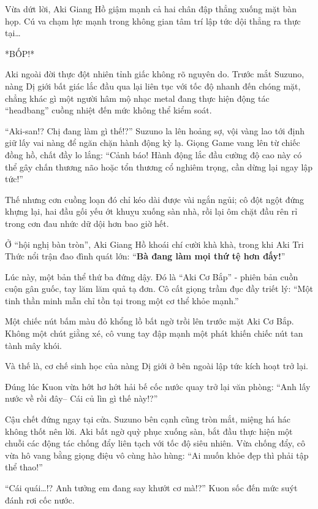 \documentclass[../main.tex]{subfiles}
\begin{document}
Vừa dứt lời, Aki Giang Hồ giậm mạnh cả hai chân đập thẳng xuống mặt bàn họp. Cú va chạm lực mạnh trong không gian tâm trí lập tức dội thẳng ra thực tại\dots

*BỐP!*

Aki ngoài đời thực đột nhiên tỉnh giấc không rõ nguyên do. Trước mắt Suzuno, nàng Dị giới bất giác lắc đầu qua lại liên tục với tốc độ nhanh đến chóng mặt, chẳng khác gì một người hâm mộ nhạc metal đang thực hiện động tác ``headbang'' cuồng nhiệt đến mức không thể kiểm soát.


``Aki-san!? Chị đang làm gì thế!?'' Suzuno la lên hoảng sợ, vội vàng lao tới định giữ lấy vai nàng để ngăn chặn hành động kỳ lạ. Giọng Game vang lên từ chiếc đồng hồ, chất đầy lo lắng: ``Cảnh báo! Hành động lắc đầu cường độ cao này có thể gây chấn thương não hoặc tổn thương cổ nghiêm trọng, cần dừng lại ngay lập tức!''

Thế nhưng cơn cuồng loạn đó chỉ kéo dài được vài ngắn ngủi; cô đột ngột đứng khựng lại, hai đầu gối yếu ớt khuỵu xuống sàn nhà, rồi lại ôm chặt đầu rên rỉ trong cơn đau nhức dữ dội hơn bao giờ hết.

Ở ``hội nghị bàn tròn'', Aki Giang Hồ khoái chí cười khà khà, trong khi Aki Tri Thức nổi trận đao đình quát lớn: ``\textbf{Bà đang làm mọi thứ tệ hơn đấy!}''

Lúc này, một bản thể thứ ba đứng dậy. Đó là ``Aki Cơ Bắp'' - phiên bản cuồn cuộn gân guốc, tay lăm lăm quả tạ đơn. Cô cất giọng trầm đục đầy triết lý: ``Một tinh thần minh mẫn chỉ tồn tại trong một cơ thể khỏe mạnh.''

Một chiếc nút bấm màu đỏ khổng lồ bất ngờ trồi lên trước mặt Aki Cơ Bắp. Không một chút giằng xé, cô vung tay đập mạnh một phát khiến chiếc nút tan tành mây khói.

Và thế là, cơ chế sinh học của nàng Dị giới ở bên ngoài lập tức kích hoạt trở lại.

Đúng lúc Kuon vừa hớt hơ hớt hải bế cốc nước quay trở lại văn phòng: ``Anh lấy nước về rồi đây-- Cái củ lìn gì thế này!?''

Cậu chết đứng ngay tại cửa. Suzuno bên cạnh cũng tròn mắt, miệng há hác không thốt nên lời. Aki bất ngờ quỳ phục xuống sàn, bắt đầu thực hiện một chuỗi các động tác chống đẩy liên tạch với tốc độ siêu nhiên. Vừa chống đẩy, cô vừa hô vang bằng giọng điệu vô cùng hào hùng: ``Ai muốn khỏe đẹp thì phải tập thể thao!''


``Cái quái\dots!? Anh tưởng em đang say khướt cơ mà!?'' Kuon sốc đến mức suýt đánh rơi cốc nước.
\end{document}
